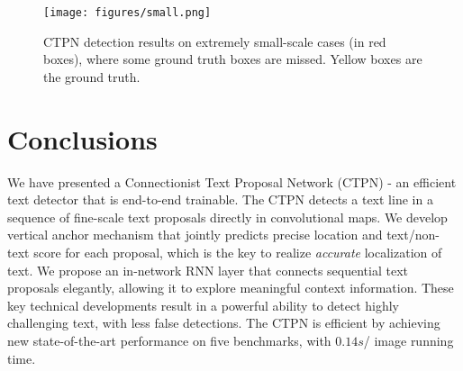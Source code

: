 \documentclass[runningheads]{llncs}
\begin{document}

\begin{figure}[tb]
\centering
\texttt{[image: figures/small.png]}
\caption{CTPN detection results on extremely small-scale cases (in red boxes), where some ground truth boxes are missed. Yellow boxes are the ground truth. }
\label{fig:samll}
\end{figure}


\section{Conclusions}

We have presented a Connectionist Text Proposal Network (CTPN) - an efficient text detector that is end-to-end trainable. The CTPN detects a text line in a sequence of fine-scale text proposals directly in convolutional maps. We develop vertical anchor mechanism that jointly predicts precise location and text/non-text score for each proposal, which is the key to realize \textit{accurate} localization of text. 
We propose an in-network RNN layer that connects sequential text proposals elegantly, allowing it to explore meaningful context information. These key technical developments result in a powerful ability to detect highly challenging text, with less false detections. The CTPN is efficient by achieving new state-of-the-art performance on five benchmarks, with $0.14s$/ image running time.


\clearpage



\end{document}
